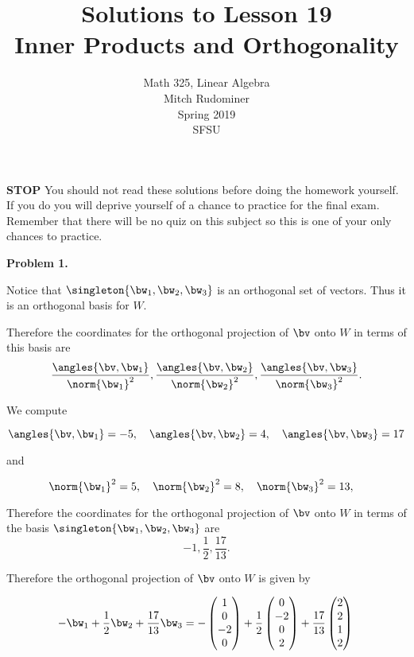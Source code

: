\documentclass[oneside,12pt]{amsart}
\begin{document}
\title{Solutions to Lesson 19 \\ Inner Products and Orthogonality}
\author{Math 325, Linear Algebra \\ Mitch Rudominer \\ Spring 2019 \\ SFSU }
\date{}

\maketitle

\bigskip

\textbf{STOP} You should not read these solutions before doing the homework yourself.
If you do you will deprive yourself of a chance to practice for the final exam.
Remember that there will be no quiz on this subject so this is one of your only
chances to practice.

\bigskip

\textbf{Problem 1.}

\bigskip

Notice that $\singleton{\bw_1,\bw_2,\bw_3}$ is an orthogonal set of vectors.
Thus it is an orthogonal basis for $W$.

Therefore the coordinates for the orthogonal projection of $\bv$ onto $W$ in terms of this basis are
$$\frac{\angles{\bv,\bw_1}}{\norm{\bw_1}^2}, \frac{\angles{\bv,\bw_2}}{\norm{\bw_2}^2},\frac{\angles{\bv,\bw_3}}{\norm{\bw_3}^2}.$$

\bigskip

We compute

$$\angles{\bv,\bw_1}= -5, \quad \angles{\bv,\bw_2}= 4 , \quad \angles{\bv,\bw_3}= 17$$

\bigskip

and

$$\norm{\bw_1}^2=5, \quad \norm{\bw_2}^2=8, \quad \norm{\bw_3}^2=13, \quad $$

\bigskip

Therefore the coordinates for the orthogonal projection of $\bv$ onto $W$ in terms of the basis $\singleton{\bw_1,\bw_2,\bw_3}$ are
$$-1, \frac{1}{2},\frac{17}{13}.$$

\bigskip

Therefore the orthogonal projection of $\bv$ onto $W$  is given by

$$
-\bw_1  +\frac{1}{2} \bw_2 + \frac{17}{13}\bw_3 =
-
\begin{pmatrix}
1  \\
0  \\
-2 \\
0
\end{pmatrix}
+
\frac{1}{2}
\begin{pmatrix}
0 \\
-2\\
0 \\
2
\end{pmatrix}
+
\frac{17}{13}
\begin{pmatrix}
2 \\
2 \\
1 \\
2
\end{pmatrix}\\
$$
\end{document}
